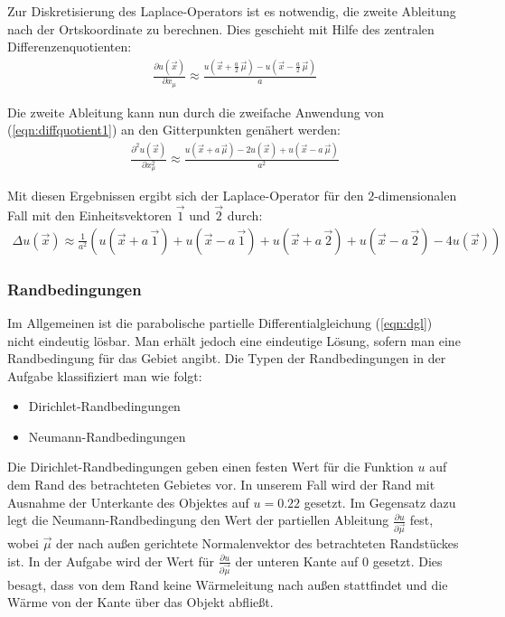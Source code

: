 \documentclass[10pt,a4paper]{article}
\begin{document}
Zur Diskretisierung des Laplace-Operators ist es notwendig, die zweite Ableitung nach der Ortskoordinate zu berechnen. Dies geschieht mit Hilfe des zentralen Differenzenquotienten:
\begin{align}
\frac{\partial u(\vec{x})}{\partial x_{\mu}}\approx\frac{u(\vec{x}+\frac{a}{2}\,\vec{\mu}) - u(\vec{x}-\frac{a}{2}\,\vec{\mu})}{a}
\label{eqn:diffquotient1}
\end{align}

Die zweite Ableitung kann nun durch die zweifache Anwendung von (\ref{eqn:diffquotient1}) an den Gitterpunkten genähert werden:
\begin{align}
\frac{\partial^2 u(\vec{x})}{\partial x_{\mu}^2}\approx\frac{u(\vec{x}+a\,\vec{\mu})-2 u(\vec{x})+u(\vec{x}-a\,\vec{\mu})}{a^2}
\label{eqn:diffquotient2}
\end{align}

Mit diesen Ergebnissen ergibt sich der Laplace-Operator für den $2$-dimensionalen Fall mit den Einheitsvektoren $\vec{1}$ und $\vec{2}$ durch:
\begin{align}
\Delta u(\vec{x})\approx\frac{1}{a^2}\left(u(\vec{x}+a\,\vec{1}) + u(\vec{x}-a\,\vec{1}) + u(\vec{x}+a\,\vec{2})+u(\vec{x}-a\,\vec{2}) -4 u(\vec{x})\right)
\label{eqn:diskret_laplace}
\end{align}

\subsubsection{Randbedingungen}
\label{randbedingungen}
Im Allgemeinen ist die parabolische partielle Differentialgleichung (\ref{eqn:dgl}) nicht eindeutig lösbar. Man erhält jedoch eine eindeutige Lösung, sofern man eine Randbedingung für das Gebiet angibt. Die Typen der Randbedingungen in der Aufgabe klassifiziert man wie folgt:
\begin{itemize}
\item Dirichlet-Randbedingungen
\item Neumann-Randbedingungen
\end{itemize}
Die Dirichlet-Randbedingungen geben einen festen Wert für die Funktion $u$ auf dem Rand des betrachteten Gebietes vor. In unserem Fall wird der Rand mit Ausnahme der Unterkante des Objektes auf $u = \num{0.22}$ gesetzt. 
Im Gegensatz dazu legt die Neumann-Randbedingung den Wert der partiellen Ableitung $\frac{\partial u}{\partial \vec{\mu}}$ fest, wobei $\vec{\mu}$ der nach außen gerichtete Normalenvektor des betrachteten Randstückes ist. In der Aufgabe wird der Wert für $\frac{\partial u}{\partial \vec{\mu}}$ der unteren Kante auf $\num{0}$ gesetzt. Dies besagt, dass von dem Rand keine Wärmeleitung nach außen stattfindet und die Wärme von der Kante über das Objekt abfließt.
\end{document}

